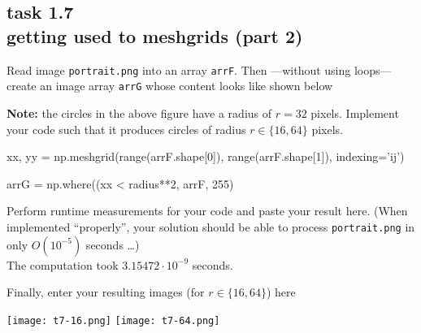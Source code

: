 
\subsection*{task 1.7 \\[1ex] getting used to meshgrids (part 2)}

Read image \texttt{portrait.png} into an array \texttt{arrF}. Then ---without using  loops--- create an image array \texttt{arrG} whose content looks like shown below
\begin{figure}[h!]
\begin{center}
 \hfill
{}
\end{center}
\end{figure}

\textbf{Note:} the circles in the above figure have a radius of $r = 32$ pixels. Implement your code such that it produces circles of radius $r \in \{ 16, 64 \}$ pixels. \\[1ex]
\begin{python}
xx, yy = np.meshgrid(range(arrF.shape[0]), range(arrF.shape[1]), indexing='ij')

arrG = np.where((xx %
				< radius**2, arrF, 255)
\end{python}



\newpage
Perform runtime measurements for your code and paste your result here. (When implemented ``properly'', your solution should be able to process  \texttt{portrait.png} in only $O(10^{-5})$ seconds \ldots)
\color{blue} \\[1ex]
The computation took $3.15472 \cdot 10^{-9}$ seconds.
\color{black}



\vspace{4cm}
Finally, enter your resulting images (for $r \in \{ 16, 64 \}$) here
\begin{center}
\texttt{[image: t7-16.png]} \hfill
\texttt{[image: t7-64.png]} 
\end{center}






